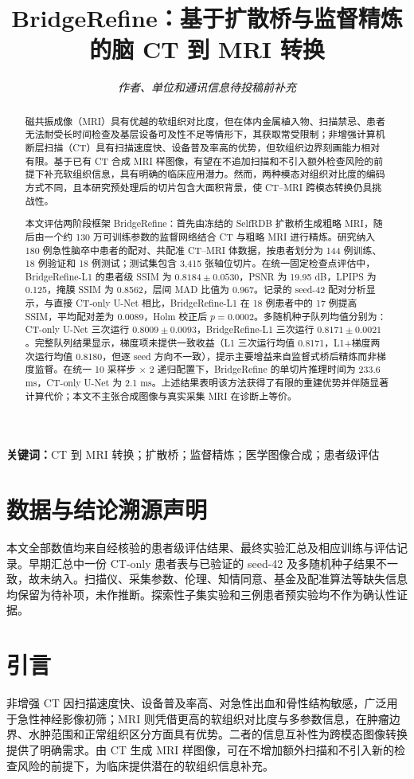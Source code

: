 \documentclass[UTF8,12pt,a4paper,twocolumn]{ctexart}
\title{BridgeRefine：基于扩散桥与监督精炼的脑 CT 到 MRI 转换}
\author{\textit{作者、单位和通讯信息待投稿前补充}}
\date{}
\begin{document}
\maketitle

\begin{abstract}
磁共振成像（MRI）具有优越的软组织对比度，但在体内金属植入物、扫描禁忌、患者无法耐受长时间检查及基层设备可及性不足等情形下，其获取常受限制；非增强计算机断层扫描（CT）具有扫描速度快、设备普及率高的优势，但软组织边界刻画能力相对有限。基于已有 CT 合成 MRI 样图像，有望在不追加扫描和不引入额外检查风险的前提下补充软组织信息，具有明确的临床应用潜力。然而，两种模态对组织对比度的编码方式不同，且本研究预处理后的切片包含大面积背景，使 CT--MRI 跨模态转换仍具挑战性。

本文评估两阶段框架 BridgeRefine：首先由冻结的 SelfRDB 扩散桥生成粗略 MRI，随后由一个约 130 万可训练参数的监督网络结合 CT 与粗略 MRI 进行精炼。研究纳入 180 例急性脑卒中患者的配对、共配准 CT--MRI 体数据，按患者划分为 144 例训练、18 例验证和 18 例测试；测试集包含 3,415 张轴位切片。在统一固定检查点评估中，BridgeRefine-L1 的患者级 SSIM 为 $0.8184\pm0.0530$，PSNR 为 19.95 dB，LPIPS 为 0.125，掩膜 SSIM 为 0.8562，层间 MAD 比值为 0.967。记录的 seed-42 配对分析显示，与直接 CT-only U-Net 相比，BridgeRefine-L1 在 18 例患者中的 17 例提高 SSIM，平均配对差为 0.0089，Holm 校正后 $p=0.0002$。多随机种子队列均值分别为：CT-only U-Net 三次运行 $0.8009\pm0.0093$，BridgeRefine-L1 三次运行 $0.8171\pm0.0021$。完整队列结果显示，梯度项未提供一致收益（L1 三次运行均值 0.8171，L1+梯度两次运行均值 0.8180，但逐 seed 方向不一致），提示主要增益来自监督式桥后精炼而非梯度监督。在统一 10 采样步 × 2 递归配置下，BridgeRefine 的单切片推理时间为 233.6 ms，CT-only U-Net 为 2.1 ms。上述结果表明该方法获得了有限的重建优势并伴随显著计算代价；本文不主张合成图像与真实采集 MRI 在诊断上等价。
\end{abstract}

\noindent\textbf{关键词：}CT 到 MRI 转换；扩散桥；监督精炼；医学图像合成；患者级评估

\section*{数据与结论溯源声明}
本文全部数值均来自经核验的患者级评估结果、最终实验汇总及相应训练与评估记录。早期汇总中一份 CT-only 患者表与已验证的 seed-42 及多随机种子结果不一致，故未纳入。扫描仪、采集参数、伦理、知情同意、基金及配准算法等缺失信息均保留为待补项，未作推断。探索性子集实验和三例患者预实验均不作为确认性证据。

\section{引言}
非增强 CT 因扫描速度快、设备普及率高、对急性出血和骨性结构敏感，广泛用于急性神经影像初筛；MRI 则凭借更高的软组织对比度与多参数信息，在肿瘤边界、水肿范围和正常组织区分方面具有优势。二者的信息互补性为跨模态图像转换提供了明确需求。由 CT 生成 MRI 样图像，可在不增加额外扫描和不引入新的检查风险的前提下，为临床提供潜在的软组织信息补充。
\end{document}
